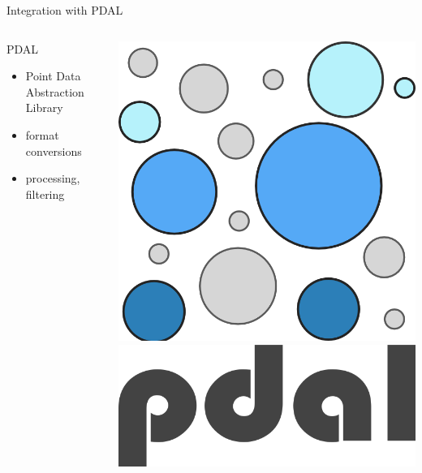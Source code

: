 \documentclass[xcolor={dvipsnames,usenames},beamer,aspectratio=169]{beamer}
\begin{document}
\begin{frame}{Integration with PDAL}

\begin{columns}
\begin{column}{0.5\textwidth}

\begin{block}{PDAL}
 \begin{itemize}
  \item Point Data Abstraction Library
  \item format conversions
  \item processing, filtering
 \end{itemize}
\end{block}

\end{column}
\begin{column}{0.25\textwidth}

\begin{center}
  \includegraphics[width=\textwidth]{logos/pdal_bubbles}\\
  \includegraphics[width=\textwidth]{logos/pdal_text}
\end{center}

\end{column}
\end{columns}

\end{frame}
\end{document}
